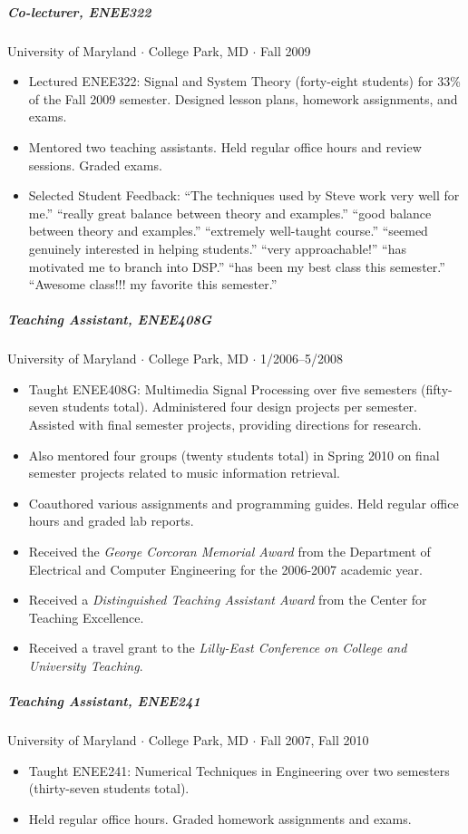 \documentclass[10pt,letterpaper]{article}
\begin{document}
\subparagraph{Co-lecturer, ENEE322}
University of Maryland $\cdot$ College Park, MD $\cdot$ Fall 2009
\begin{itemize}
\item Lectured ENEE322: Signal and System Theory (forty-eight students) for 33\% of the Fall 2009 semester. Designed lesson plans, homework assignments, and exams.
\item Mentored two teaching assistants. Held regular office hours and review sessions. Graded exams.
\item Selected Student Feedback: ``The techniques used by Steve work very well for me.'' ``really great balance between theory and examples.'' ``good balance between theory and examples.'' ``extremely well-taught course.'' ``seemed genuinely interested in helping students.'' ``very approachable!'' ``has motivated me to branch into DSP.'' ``has been my best class this semester.'' ``Awesome class!!! my favorite this semester.''
\end{itemize}

\subparagraph{Teaching Assistant, ENEE408G} 
University of Maryland $\cdot$ College Park, MD $\cdot$ 1/2006--5/2008
\begin{itemize}
\item Taught ENEE408G: Multimedia Signal Processing over five semesters (fifty-seven students total). Administered four design projects per semester. Assisted with final semester projects, providing directions for research. 
\item Also mentored four groups (twenty students total) in Spring 2010 on final semester projects related to music information retrieval.
\item Coauthored various assignments and programming guides. Held regular office hours and graded lab reports.
\item Received the \textit{George Corcoran Memorial Award} from the Department of Electrical and Computer Engineering for the 2006-2007 academic year.
\item Received a \textit{Distinguished Teaching Assistant Award} from the Center for Teaching Excellence. 
\item Received a travel grant to the \textit{Lilly-East Conference on College and University Teaching}.
\end{itemize}

\subparagraph{Teaching Assistant, ENEE241}
University of Maryland $\cdot$ College Park, MD $\cdot$ Fall 2007, Fall 2010
\begin{itemize}
\item Taught ENEE241: Numerical Techniques in Engineering over two semesters (thirty-seven students total).
\item Held regular office hours. Graded homework assignments and exams.
\end{itemize}
\end{document}
